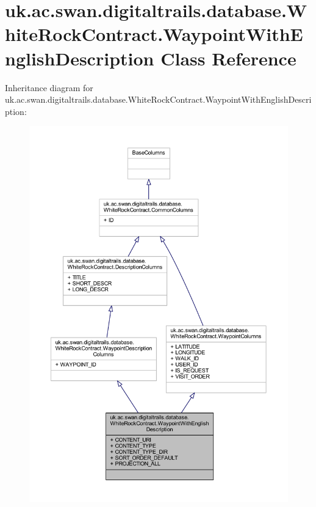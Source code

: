 \hypertarget{classuk_1_1ac_1_1swan_1_1digitaltrails_1_1database_1_1_white_rock_contract_1_1_waypoint_with_english_description}{\section{uk.\+ac.\+swan.\+digitaltrails.\+database.\+White\+Rock\+Contract.\+Waypoint\+With\+English\+Description Class Reference}
\label{classuk_1_1ac_1_1swan_1_1digitaltrails_1_1database_1_1_white_rock_contract_1_1_waypoint_with_english_description}
}


Inheritance diagram for uk.\+ac.\+swan.\+digitaltrails.\+database.\+White\+Rock\+Contract.\+Waypoint\+With\+English\+Description\+:
\nopagebreak
\begin{figure}[H]
\begin{center}
\leavevmode
\includegraphics[width=350pt]{classuk_1_1ac_1_1swan_1_1digitaltrails_1_1database_1_1_white_rock_contract_1_1_waypoint_with_engdb79d9e3a5460106333ffd4c879ee426}
\end{center}
\end{figure}


